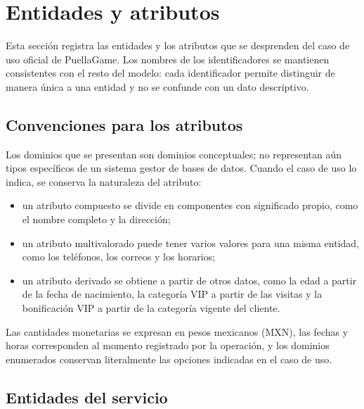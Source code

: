 \section{Entidades y atributos}

Esta sección registra las entidades y los atributos que se desprenden del caso
de uso oficial de PuellaGame. Los nombres de los identificadores se mantienen
consistentes con el resto del modelo: cada identificador permite distinguir de
manera única a una entidad y no se confunde con un dato descriptivo.

\subsection{Convenciones para los atributos}

Los dominios que se presentan son dominios conceptuales; no representan aún
tipos específicos de un sistema gestor de bases de datos. Cuando el caso de
uso lo indica, se conserva la naturaleza del atributo:

\begin{itemize}[leftmargin=*]
  \item un atributo compuesto se divide en componentes con significado
        propio, como el nombre completo y la dirección;
  \item un atributo multivalorado puede tener varios valores para una misma
        entidad, como los teléfonos, los correos y los horarios;
  \item un atributo derivado se obtiene a partir de otros datos, como la edad
        a partir de la fecha de nacimiento, la categoría VIP a partir de las
        visitas y la bonificación VIP a partir de la categoría vigente del
        cliente.
\end{itemize}

Las cantidades monetarias se expresan en pesos mexicanos (MXN), las fechas y
horas corresponden al momento registrado por la operación, y los dominios
enumerados conservan literalmente las opciones indicadas en el caso de uso.

\subsection{Entidades del servicio}

